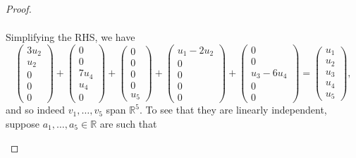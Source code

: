 \documentclass{extarticle}
\newcommand{\R}{\mathbb{R}}
\begin{document}
\begin{proof}
\begin{enumerate}[(a)]
\begin{multline*}
\end{multline*}
Simplifying the RHS, we have
\begin{equation*}
\begin{pmatrix} 3u_2 \\ u_2 \\ 0 \\ 0\\ 0 \end{pmatrix} + \begin{pmatrix} 0 \\ 0 \\ 7u_4 \\ u_4 \\ 0 \end{pmatrix} + \begin{pmatrix} 0 \\ 0 \\ 0 \\ 0 \\ u_5 \end{pmatrix} + \begin{pmatrix} u_1 -2u_2\\ 0 \\ 0 \\ 0 \\ 0 \end{pmatrix} + \begin{pmatrix} 0 \\ 0 \\ u_3 - 6u_4 \\ 0 \\ 0 \end{pmatrix} = 
\begin{pmatrix} u_1 \\ u_2 \\ u_3 \\ u_4\\ u_5 \end{pmatrix},
\end{equation*}
and so indeed $v_1,\dots, v_5$ span $\R^5$.  To see that they are linearly independent, suppose $a_1,\dots,a_5\in\R$ are such that 
\begin{equation*}

\end{equation*}
\end{enumerate}
\end{proof}
\end{document}

